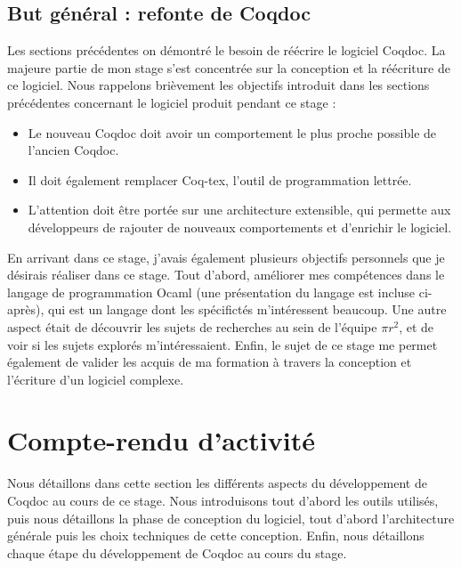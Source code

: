 \documentclass[a4paper, 11pt]{report}
\newcommand{\pir}[0]{\textbf{$\pi r^2$}\xspace}
\begin{document}
    \clearpage
    \subsection{But général : refonte de Coqdoc}
    Les sections précédentes on démontré le besoin de réécrire le logiciel
    Coqdoc. La majeure partie de mon stage s'est concentrée sur la conception
    et la réécriture de ce logiciel.
    Nous rappelons brièvement les objectifs introduit dans les sections
    précédentes concernant le logiciel produit pendant ce stage :
    \begin{itemize}
      \item Le nouveau Coqdoc doit avoir un comportement le plus proche
        possible de l'ancien Coqdoc.
      \item Il doit également remplacer Coq-tex, l'outil de programmation
        lettrée.
      \item L'attention doit être portée sur une architecture extensible, qui
        permette aux développeurs de rajouter de nouveaux comportements
        et d'enrichir le logiciel.
    \end{itemize}

    En arrivant dans ce stage, j'avais également plusieurs objectifs personnels
    que je désirais réaliser dans ce stage. Tout d'abord, améliorer
    mes compétences dans le langage de programmation Ocaml (une présentation
    du langage est incluse ci-après), qui est un langage dont les spécifictés
    m'intéressent beaucoup.
    Une autre aspect était de découvrir les sujets de recherches au sein de
    l'équipe \pir, et de voir si les sujets explorés m'intéressaient.
    Enfin, le sujet de ce stage me permet également de valider les acquis de
    ma formation à travers la conception et l'écriture d'un logiciel complexe.

  \section{Compte-rendu d'activité}
  Nous détaillons dans cette section les différents aspects du développement
  de Coqdoc au cours de ce stage.  Nous introduisons tout d'abord les outils
  utilisés, puis nous détaillons la phase de conception du logiciel, tout
  d'abord l'architecture générale puis les choix techniques de cette
  conception. Enfin, nous détaillons chaque étape du développement de Coqdoc
  au cours du stage.
\end{document}
